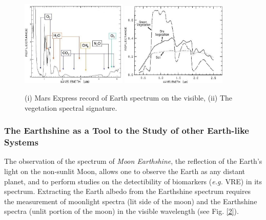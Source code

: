 \begin{figure}[h]
\begin{center}
 \includegraphics[width=0.45\textwidth]{figs/1.jpg}
 \includegraphics[width=0.45\textwidth]{figs/2.jpg}
\caption{\footnotesize (i) Mars Express record of Earth
spectrum on the visible, (ii) The vegetation spectral signature.}
\label{1}
\end{center}
\end{figure}





\subsubsection*{The Earthshine as a Tool to the Study of other Earth-like
Systems}

The observation of the spectrum of {\it Moon Earthshine}, \ie the reflection of
the Earth's light on the non-sunlit Moon, allows one to observe the
Earth as any distant planet, and to perform studies on the detectibility of
biomarkers ({\it e.g.} VRE) in its spectrum. Extracting the Earth albedo from
the Earthshine spectrum requires the measurement of moonlight spectra (lit side
of the moon) and the Earthshine spectra (unlit portion of the moon) in the
visible wavelength \citep{woolf_etal02} (see Fig. \ref{2}).



